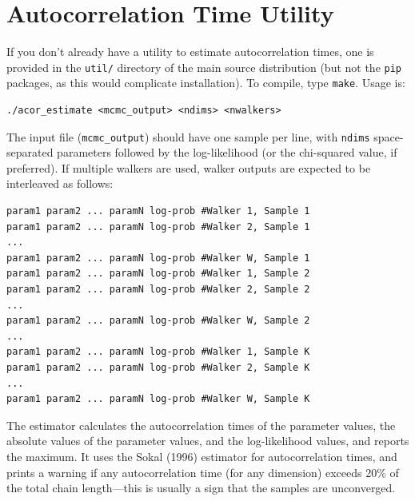 \documentclass[12pt]{article}
\begin{document}
\section{Autocorrelation Time Utility}

If you don't already have a utility to estimate autocorrelation times, one is provided in the \texttt{util/} directory of the main source distribution (but not the \texttt{pip} packages, as this would complicate installation).  To compile, type \texttt{make}.  Usage is:
\begin{lstlisting}
./acor_estimate <mcmc_output> <ndims> <nwalkers>
\end{lstlisting} 
The input file (\texttt{mcmc\_output}) should have one sample per line, with \texttt{ndims} space-separated parameters followed by the log-likelihood (or the chi-squared value, if preferred).  If multiple walkers are used, walker outputs are expected to be interleaved as follows:
\begin{lstlisting}
param1 param2 ... paramN log-prob #Walker 1, Sample 1
param1 param2 ... paramN log-prob #Walker 2, Sample 1
...
param1 param2 ... paramN log-prob #Walker W, Sample 1
param1 param2 ... paramN log-prob #Walker 1, Sample 2
param1 param2 ... paramN log-prob #Walker 2, Sample 2
...
param1 param2 ... paramN log-prob #Walker W, Sample 2
...
param1 param2 ... paramN log-prob #Walker 1, Sample K
param1 param2 ... paramN log-prob #Walker 2, Sample K
...
param1 param2 ... paramN log-prob #Walker W, Sample K
\end{lstlisting}
The estimator calculates the autocorrelation times of the parameter values, the absolute values of the parameter values, and the log-likelihood values, and reports the maximum.  It uses the Sokal (1996) estimator for autocorrelation times, and prints a warning if any autocorrelation time (for any dimension) exceeds 20\% of the total chain length---this is usually a sign that the samples are unconverged.
\end{document}
